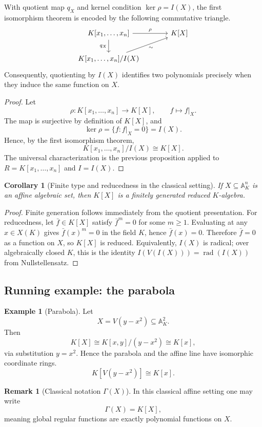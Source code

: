 \documentclass[12pt, a4paper]{article}
\newtheorem{corollary}[theorem]{Corollary}
\theoremstyle{definition}
\newtheorem{example}[theorem]{Example}
\newtheorem{remark}[theorem]{Remark}
\DeclareMathOperator{\rad}{rad}
\newcommand{\A}{\mathbb{A}}
\begin{document}
With quotient map $q_X$ and kernel condition $\ker\rho=I(X)$, the first isomorphism theorem is encoded by the following commutative triangle.
\[
\begin{tikzcd}[column sep=large]
K[x_1,\dots,x_n] \arrow[r, "\rho"] \arrow[d, "q_X"'] & K[X] \\
K[x_1,\dots,x_n]/I(X) \arrow[ur, "\sim"'] &
\end{tikzcd}
\]
Consequently, quotienting by $I(X)$ identifies two polynomials precisely when they induce the same function on $X$.

\begin{proof}
Let
\[
\rho:K[x_1,\dots,x_n]\to K[X],\qquad f\mapsto f|_X.
\]
The map is surjective by definition of $K[X]$, and
\[
\ker\rho=\{f:f|_X=0\}=I(X).
\]
Hence, by the first isomorphism theorem,
\[
K[x_1,\dots,x_n]/I(X)\cong K[X].
\]
The universal characterization is the previous proposition applied to $R=K[x_1,\dots,x_n]$ and $I=I(X)$.
\end{proof}

\begin{corollary}[Finite type and reducedness in the classical setting]
If $X\subseteq \A_K^n$ is an affine algebraic set, then $K[X]$ is a finitely generated reduced $K$-algebra.
\end{corollary}

\begin{proof}
Finite generation follows immediately from the quotient presentation. For reducedness, let $\bar f\in K[X]$ satisfy $\bar f^m=0$ for some $m\ge 1$. Evaluating at any $x\in X(K)$ gives $\bar f(x)^m=0$ in the field $K$, hence $\bar f(x)=0$. Therefore $\bar f=0$ as a function on $X$, so $K[X]$ is reduced. Equivalently, $I(X)$ is radical; over algebraically closed $K$, this is the identity $I(V(I(X)))=\rad(I(X))$ from Nullstellensatz.
\end{proof}

\subsection{Running example: the parabola}

\begin{example}[Parabola]
Let
\[
X=V(y-x^2)\subseteq \A_K^2.
\]
Then
\[
K[X]\cong K[x,y]/(y-x^2)\cong K[x],
\]
via substitution $y=x^2$. Hence the parabola and the affine line have isomorphic coordinate rings.
\[
\boxed{K[V(y-x^2)]\cong K[x].}
\]
\end{example}

\begin{remark}[Classical notation $\Gamma(X)$]
In this classical affine setting one may write
\[
\Gamma(X)=K[X],
\]
meaning global regular functions are exactly polynomial functions on $X$.
\end{remark}
\end{document}
